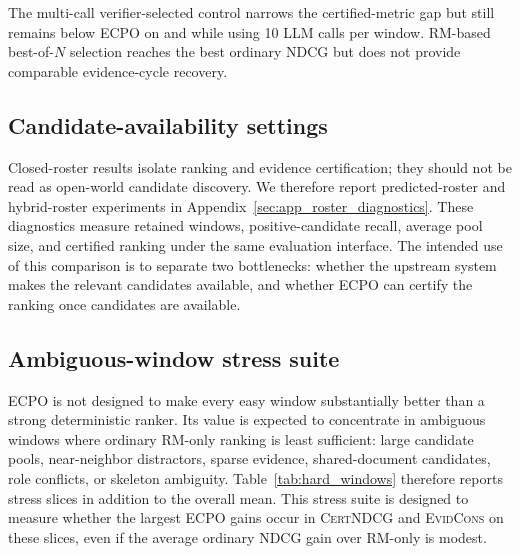 \documentclass{article}
\newcommand{\CertNDCG}{\textsc{CertNDCG}}
\newcommand{\EvidCons}{\textsc{EvidCons}}
\begin{document}
The multi-call verifier-selected control narrows the certified-metric gap but still remains below ECPO on  and  while using 10 LLM calls per window. RM-based best-of-$N$ selection reaches the best ordinary NDCG but does not provide comparable evidence-cycle recovery.

\subsection{Candidate-availability settings}
\label{sec:exp_rosters}
Closed-roster results isolate ranking and evidence certification; they should not be read as open-world candidate discovery. We therefore report predicted-roster and hybrid-roster experiments in Appendix~\ref{sec:app_roster_diagnostics}. These diagnostics measure retained windows, positive-candidate recall, average pool size, and certified ranking under the same evaluation interface. The intended use of this comparison is to separate two bottlenecks: whether the upstream system makes the relevant candidates available, and whether ECPO can certify the ranking once candidates are available.

\subsection{Ambiguous-window stress suite}
\label{sec:exp_hard_windows}
ECPO is not designed to make every easy window substantially better than a strong deterministic ranker. Its value is expected to concentrate in ambiguous windows where ordinary RM-only ranking is least sufficient: large candidate pools, near-neighbor distractors, sparse evidence, shared-document candidates, role conflicts, or skeleton ambiguity. Table~\ref{tab:hard_windows} therefore reports stress slices in addition to the overall mean. This stress suite is designed to measure whether the largest ECPO gains occur in \CertNDCG{} and \EvidCons{} on these slices, even if the average ordinary NDCG gain over RM-only is modest.
\end{document}
